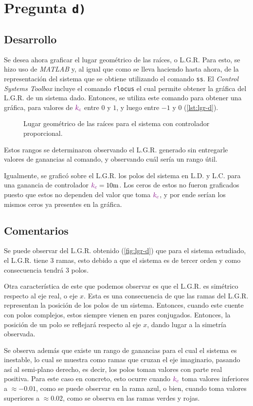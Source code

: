 \section{Pregunta \texttt{d)}}\label{pregunta-d}

\subsection{Desarrollo}

Se desea ahora graficar el lugar geométrico de las raíces, o L.G.R. Para esto,
se hizo uso de \textit{MATLAB} y, al igual que como se lleva haciendo hasta
ahora, de la representación del sistema que se obtiene utilizando el comando
\verb|ss|. El \textit{Control Systems Toolbox} incluye el comando \verb|rlocus|
el cual permite obtener la gráfica del L.G.R. de un sistema dado. Entonces,
se utiliza este comando para obtener una gráfica, para valores de $\mathbin{\color{violet}k_{c}}$
entre $0$ y $1$, y luego entre $-1$ y $0$ (\autoref{lst:lgr-d}).

\begin{figure}[ht]
  \centering
  
  \caption{Lugar geométrico de las raíces para el sistema con controlador proporcional.}
  \label{fig:lgr-d}
\end{figure}

Estos rangos se determinaron observando el L.G.R. generado sin entregarle valores
de ganancias al comando, y observando cuál sería un rango útil.

Igualmente, se graficó sobre el L.G.R. los polos del sistema en L.D. y L.C. para
una ganancia de controlador $\mora{k_{c}} = 10\unit{m}$. Los ceros de estos no
fueron graficados puesto que estos no dependen del valor que toma $\mathbin{\color{violet}k_{c}}$,
y por ende serían los mismos ceros ya presentes en la gráfica.

\subsection{Comentarios}

Se puede observar del L.G.R. obtenido (\autoref{fig:lgr-d}) que para el sistema
estudiado, el L.G.R. tiene $3$ ramas, esto debido a que el sistema es de tercer
orden y como consecuencia tendrá $3$ polos.

Otra característica de este que podemos observar es que el L.G.R. es simétrico
respecto al eje real, o eje $x$. Esta es una consecuencia de que las ramas del
L.G.R. representan la posición de los polos de un sistema. Entonces, cuando este
cuente con polos complejos, estos siempre vienen en pares conjugados. Entonces,
la posición de un polo se reflejará respecto al eje $x$, dando lugar a la simetría
observada.

Se observa además que existe un rango de ganancias para el cual el sistema es
inestable, lo cual se muestra como ramas que cruzan el eje imaginario, pasando
así al semi-plano derecho, es decir, los polos toman valores con parte real
positiva. Para este caso en concreto, esto ocurre cuando $\mathbin{\color{violet}k_{c}}$ toma
valores inferiores a $\approx -0.01$, como se puede observar en la rama azul,
o bien, cuando toma valores superiores a $\approx 0.02$, como se observa en las
ramas verdes y rojas.

